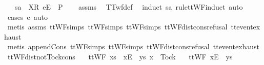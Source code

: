 \begin{isabellebody}
\ \ \ {\isachardoublequoteopen}sa\ {\isacharat}\ {\isacharbrackleft}{\isacharbrackleft}X{\isacharbrackright}\isactrlsub R{\isacharcomma}\ {\isacharbrackleft}e{\isacharbrackright}\isactrlsub E{\isacharbrackright}\ {\isasymnotin}\ P{\isachardoublequoteclose}\isanewline
%
\isadelimproof
\ \ %
\endisadelimproof
%
\isatagproof
{}\isamarkupfalse%
\ assms\ \isamarkupfalse%
\ TTwf{\isacharunderscore}def\ \isamarkupfalse%
\ {\isacharparenleft}induct\ sa\ rule{\isacharcolon}ttWF{\isachardot}induct{\isacharcomma}\ auto{\isacharparenright}\isanewline
\ \ \ \ \isamarkupfalse%
\ {\isacharparenleft}cases\ e{\isacharcomma}\ auto{\isacharparenright}\isanewline
\ \ \isamarkupfalse%
\ {\isacharparenleft}metis\ assms{\isacharparenleft}{}{\isacharparenright}\ ttWF{\isachardot}simps{\isacharparenleft}{}{}{\isacharparenright}\ ttWF{\isachardot}simps{\isacharparenleft}{}{}{\isacharparenright}\ ttWF{\isachardot}simps{\isacharparenleft}{}{\isacharparenright}\ ttWF{\isacharunderscore}dist{\isacharunderscore}cons{\isacharunderscore}refusal\ ttevent{\isachardot}exhaust{\isacharparenright}\isanewline
\ \ \isamarkupfalse%
\ {\isacharparenleft}metis\ append{\isacharunderscore}Cons\ ttWF{\isachardot}simps{\isacharparenleft}{}{}{\isacharparenright}\ ttWF{\isachardot}simps{\isacharparenleft}{}{}{\isacharparenright}\ ttWF{\isacharunderscore}dist{\isacharunderscore}cons{\isacharunderscore}refusal\ ttevent{\isachardot}exhaust{\isacharparenright}%
\endisatagproof
{\isafoldproof}%
%
\isadelimproof
\isanewline
%
\endisadelimproof
\isanewline
{}\isamarkupfalse%
\ ttWF{\isacharunderscore}dist{\isacharunderscore}notTock{\isacharunderscore}cons{\isacharcolon}\isanewline
\ \ \ {\isachardoublequoteopen}ttWF\ {\isacharparenleft}xs\ {\isacharat}\ {\isacharparenleft}{\isacharbrackleft}{\isacharbrackleft}x{\isacharbrackright}\isactrlsub E{\isacharbrackright}\ {\isacharat}\ ys{\isacharparenright}{\isacharparenright}{\isachardoublequoteclose}\ {\isachardoublequoteopen}x\ {\isasymnoteq}\ Tock{\isachardoublequoteclose}\isanewline
\ \ \ {\isachardoublequoteopen}ttWF\ {\isacharparenleft}{\isacharbrackleft}{\isacharbrackleft}x{\isacharbrackright}\isactrlsub E{\isacharbrackright}\ {\isacharat}\ ys{\isacharparenright}{\isachardoublequoteclose}\isanewline
%
\isadelimproof
\ \ %
\endisadelimproof
%
\isatagproof
{}\isamarkupfalse%

\end{isabellebody}
